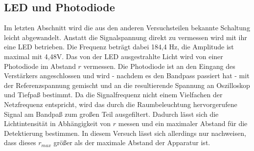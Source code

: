 \subsection{LED und Photodiode}
Im letzten Abschnitt wird die aus den anderen Versuchsteilen bekannte Schaltung
leicht abgewandelt. Anstatt die Signalspannung direkt zu vermessen wird mit ihr
eine LED betrieben. Die Frequenz beträgt dabei 184,4 Hz, die Amplitude ist
maximal mit 4,48V. Das von der LED ausgestrahlte Licht wird von einer Photodiode
im Abstand $r$ vermessen. Die Photodiode ist an den Eingang des Verstärkers
angeschlossen und wird - nachdem es den Bandpass passiert hat - mit der
Referenzspannung gemischt und an die resultierende Spannung an
Oszilloskop und Tiefpaß bestimmt. Da die Signalfrequenz nicht einem Vielfachen
der Netzfrequenz entspricht, wird das durch die Raumbeleuchtung hervorgerufene
Signal am Bandpaß
zum großen Teil ausgefiltert. Dadurch lässt sich die Lichtintensität in
Abhängigkeit von $r$ messen und ein maximaler Abstand für die Detektierung
bestimmen. In diesem Versuch lässt sich allerdings nur nachweisen, dass
dieses $r_{max}$ größer als der maximale Abstand der Apparatur ist.
